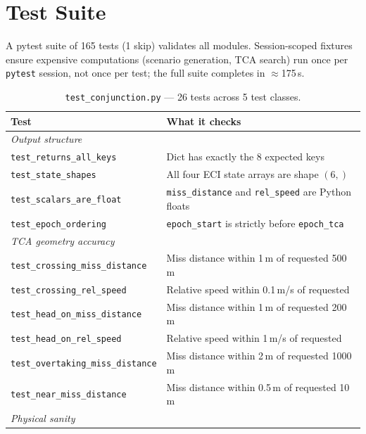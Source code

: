 \documentclass[11pt]{article}
\begin{document}
\section{Test Suite}
\label{sec:tests}

A pytest suite of 165 tests (1 skip) validates all modules.  Session-scoped
fixtures ensure expensive computations (scenario generation, TCA search) run
once per \texttt{pytest} session, not once per test; the full suite completes
in $\approx$175\,s.

\begin{table}[htb]
\centering
\small
\caption{\texttt{test\_conjunction.py} — 26 tests across 5 test classes.}
\label{tab:test_conjunction}
\begin{tabular}{lp{10cm}}
  \toprule
  Test & What it checks \\
  \midrule
  \multicolumn{2}{l}{\textit{Output structure}} \\
  \texttt{test\_returns\_all\_keys} & Dict has exactly the 8 expected keys \\
  \texttt{test\_state\_shapes} & All four ECI state arrays are shape $(6,)$ \\
  \texttt{test\_scalars\_are\_float} & \texttt{miss\_distance} and \texttt{rel\_speed} are Python floats \\
  \texttt{test\_epoch\_ordering} & \texttt{epoch\_start} is strictly before \texttt{epoch\_tca} \\
  \midrule
  \multicolumn{2}{l}{\textit{TCA geometry accuracy}} \\
  \texttt{test\_crossing\_miss\_distance} & Miss distance within 1\,m of requested 500\,m \\
  \texttt{test\_crossing\_rel\_speed} & Relative speed within 0.1\,m/s of requested \\
  \texttt{test\_head\_on\_miss\_distance} & Miss distance within 1\,m of requested 200\,m \\
  \texttt{test\_head\_on\_rel\_speed} & Relative speed within 1\,m/s of requested \\
  \texttt{test\_overtaking\_miss\_distance} & Miss distance within 2\,m of requested 1000\,m \\
  \texttt{test\_near\_miss\_distance} & Miss distance within 0.5\,m of requested 10\,m \\
  \midrule
  \multicolumn{2}{l}{\textit{Physical sanity}} \\

\end{tabular}
\end{table}
\end{document}
